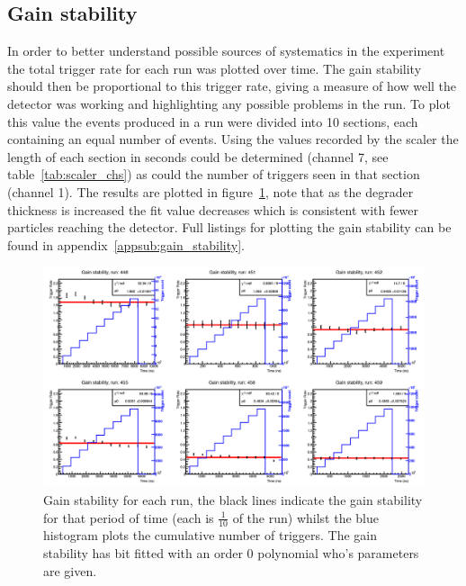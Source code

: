 \subsection{Gain stability} %
\label{sub:gain_stability}
In order to better understand possible sources of systematics in the experiment the total trigger rate for each run was plotted over time. The gain stability should then be proportional to this trigger rate, giving a measure of how well the detector was working and highlighting any possible problems in the run. To plot this value the events produced in a run were divided into 10 sections, each containing an equal number of events. Using the values recorded by the scaler the length of each section in seconds could be determined (channel 7, see table~\ref{tab:scaler_chs}) as could the number of triggers seen in that section (channel 1). The results are plotted in figure~\ref{fig:gain_stability}, note that as the degrader thickness is increased the fit value decreases which is consistent with fewer particles reaching the detector. Full listings for plotting the gain stability can be found in appendix~\ref{appsub:gain_stability}.
%

\begin{figure}
      \centering
          \includegraphics[width=\textwidth]{images/momentum_spectrum/gain_stability.png}
      \caption{Gain stability for each run, the black lines indicate the gain stability for that period of time (each is  \(\frac{1}{10}\) of the run) whilst the blue histogram plots the cumulative number of triggers. The gain stability has bit fitted with an order 0 polynomial who's parameters are given.}
      \label{fig:gain_stability}
\end{figure}

